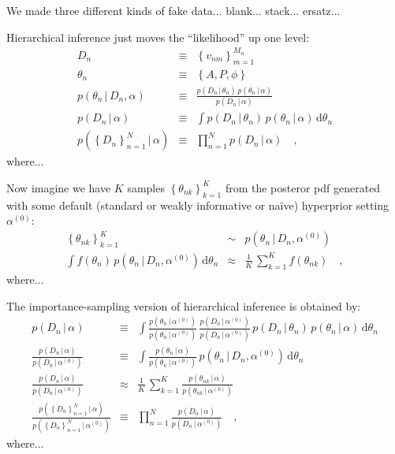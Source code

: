 \documentclass[12pt]{article}
\newcommand{\given}{\,|\,}
\newcommand{\dd}{\mathrm{d}}
\newcommand{\pdf}{p}
\newcommand{\setof}[1]{\left\{{#1}\right\}}
\newcommand{\data}{D_n}
\newcommand{\setofalldata}{\setof{\data}_{n=1}^N}
\newcommand{\parsymbol}{\theta}
\newcommand{\pars}{\parsymbol_n}
\newcommand{\hyperpars}{\alpha}
\newcommand{\sample}{\parsymbol_{nk}}
\newcommand{\default}[1]{{#1}^{(0)}}
\newcommand{\setofallsamples}{\setof{\sample}_{k=1}^K}
\newcommand{\amp}{A}
\newcommand{\period}{P}
\newcommand{\phase}{\phi}
\begin{document}
We made three different kinds of fake data... blank... stack... ersatz...

Hierarchical inference just moves the ``likelihood'' up one level:
\begin{eqnarray}
\data
  &\equiv&
\setof{v_{nm}}_{m=1}^{M_n}
\\
\pars
  &\equiv&
\setof{\amp, \period, \phase}
\\
\pdf(\pars\given\data,\hyperpars)
  &\equiv&
\frac{\pdf(\data\given\pars)\,\pdf(\pars\given\hyperpars)}{\pdf(\data\given\hyperpars)}
\\
\pdf(\data\given\hyperpars)
  &\equiv&
\int \pdf(\data\given\pars)\,\pdf(\pars\given\hyperpars)\,\dd\pars
\\
\pdf(\setofalldata\given\hyperpars)
  &\equiv&
\prod_{n=1}^N \pdf(\data\given\hyperpars)
\quad,
\end{eqnarray}
where...

Now imagine we have $K$ samples $\setofallsamples$ from the
posteror pdf generated with some default (standard or weakly
informative or na\"ive) hyperprior setting $\default{\hyperpars}$:
\begin{eqnarray}
\setofallsamples
 &\sim&
\pdf(\pars\given\data,\default{\hyperpars})
\\
\int f(\pars)\,\pdf(\pars\given\data,\default{\hyperpars})\,\dd\pars
 &\approx&
\frac{1}{K}\,\sum_{k=1}^K f(\sample)
\quad,
\end{eqnarray}
where...

The importance-sampling version of hierarchical inference is
obtained by:
\begin{eqnarray}
\pdf(\data\given\hyperpars)
 &\equiv&
\int \frac{\pdf(\pars\given\default{\hyperpars})}{\pdf(\pars\given\default{\hyperpars})}\,\frac{\pdf(\data\given\default{\hyperpars})}{\pdf(\data\given\default{\hyperpars})}\,\pdf(\data\given\pars)\,\pdf(\pars\given\hyperpars)\,\dd\pars
\\
\frac{\pdf(\data\given\hyperpars)}{\pdf(\data\given\default{\hyperpars})} 
 &\equiv&
\int \frac{\pdf(\pars\given\hyperpars)}{\pdf(\pars\given\default{\hyperpars})}\,\pdf(\pars\given\data,\default{\hyperpars})\,\dd\pars
\\
\frac{\pdf(\data\given\hyperpars)}{\pdf(\data\given\default{\hyperpars})} 
 &\approx&
\frac{1}{K}\,\sum_{k=1}^K \frac{\pdf(\sample\given\hyperpars)}{\pdf(\sample\given\default{\hyperpars})}
\\
\frac{\pdf(\setofalldata\given\hyperpars)}{\pdf(\setofalldata\given\default{\hyperpars})} &\equiv& \prod_{n=1}^N \frac{\pdf(\data\given\hyperpars)}{\pdf(\data\given\default{\hyperpars})}
\quad,
\end{eqnarray}
where...
\end{document}
